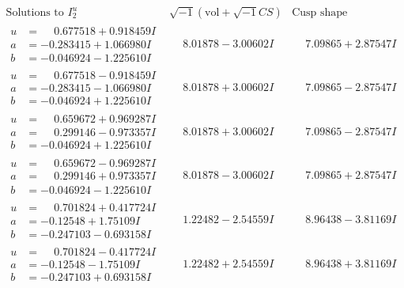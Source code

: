 \documentclass[1p]{elsarticle_modified}
\theoremstyle{definition}
\newcommand{\I}{\sqrt{-1}}
\begin{document}
$$\begin{array}{c|c|c}  
\text{Solutions to }I^u_{2}& \I (\text{vol} + \sqrt{-1}CS) & \text{Cusp shape}\\
 \hline 
\begin{aligned}
u &= \phantom{-}0.677518 + 0.918459 I \\
a &= -0.283415 + 1.066980 I \\
b &= -0.046924 - 1.225610 I\end{aligned}
 & \phantom{-}8.01878 - 3.00602 I & \phantom{-}7.09865 + 2.87547 I \\ \hline\begin{aligned}
u &= \phantom{-}0.677518 - 0.918459 I \\
a &= -0.283415 - 1.066980 I \\
b &= -0.046924 + 1.225610 I\end{aligned}
 & \phantom{-}8.01878 + 3.00602 I & \phantom{-}7.09865 - 2.87547 I \\ \hline\begin{aligned}
u &= \phantom{-}0.659672 + 0.969287 I \\
a &= \phantom{-}0.299146 - 0.973357 I \\
b &= -0.046924 + 1.225610 I\end{aligned}
 & \phantom{-}8.01878 + 3.00602 I & \phantom{-}7.09865 - 2.87547 I \\ \hline\begin{aligned}
u &= \phantom{-}0.659672 - 0.969287 I \\
a &= \phantom{-}0.299146 + 0.973357 I \\
b &= -0.046924 - 1.225610 I\end{aligned}
 & \phantom{-}8.01878 - 3.00602 I & \phantom{-}7.09865 + 2.87547 I \\ \hline\begin{aligned}
u &= \phantom{-}0.701824 + 0.417724 I \\
a &= -0.12548 + 1.75109 I \\
b &= -0.247103 - 0.693158 I\end{aligned}
 & \phantom{-}1.22482 - 2.54559 I & \phantom{-}8.96438 - 3.81169 I \\ \hline\begin{aligned}
u &= \phantom{-}0.701824 - 0.417724 I \\
a &= -0.12548 - 1.75109 I \\
b &= -0.247103 + 0.693158 I\end{aligned}
 & \phantom{-}1.22482 + 2.54559 I & \phantom{-}8.96438 + 3.81169 I \\ \hline\begin{aligned}

\end{aligned}
\end{array}$$
\end{document}
